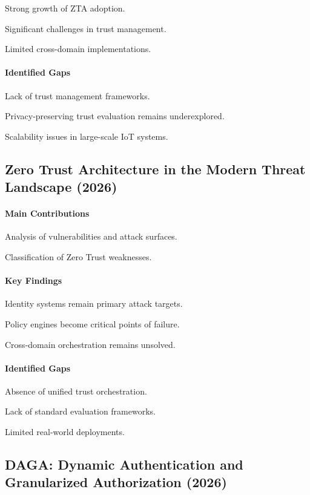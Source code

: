 Strong growth of ZTA adoption.


Significant challenges in trust management.


Limited cross-domain implementations.


\paragraph{Identified Gaps}

Lack of trust management frameworks.


Privacy-preserving trust evaluation remains underexplored.


Scalability issues in large-scale IoT systems.


\subsection{Zero Trust Architecture in the Modern Threat Landscape (2026)}

\paragraph{Main Contributions}

Analysis of vulnerabilities and attack surfaces.


Classification of Zero Trust weaknesses.


\paragraph{Key Findings}

Identity systems remain primary attack targets.


Policy engines become critical points of failure.


Cross-domain orchestration remains unsolved.


\paragraph{Identified Gaps}

Absence of unified trust orchestration.


Lack of standard evaluation frameworks.


Limited real-world deployments.


\subsection{DAGA: Dynamic Authentication and Granularized Authorization (2026)}

